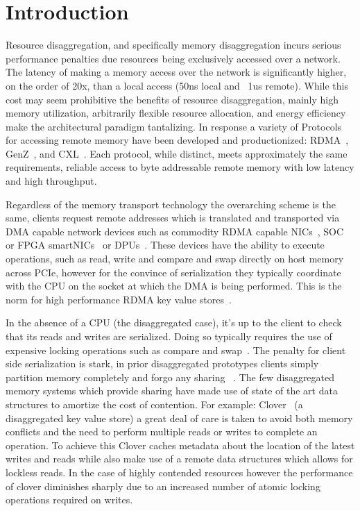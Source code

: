 \section{Introduction}

Resource disaggregation, and specifically memory disaggregation incurs serious
performance penalties due resources being exclusively accessed over a network.
The latency of making a memory access over the network is significantly higher,
on the order of 20x, than a local access (50ns local and ~1us remote).  While
this cost may seem prohibitive the benefits of resource disaggregation, mainly
high memory utilization, arbitrarily flexible resource allocation, and energy
efficiency~\cite{zombieland} make the architectural paradigm tantalizing. In
response a variety of Protocols for accessing remote memory have been developed
and productionized: RDMA~\cite{infiniband-spec}, GenZ~\cite{genz}, and
CXL~\cite{cxl}.
Each protocol, while distinct, meets approximately the same requirements,
reliable access to byte addressable remote memory with low latency and high
throughput.

Regardless of the memory transport technology the overarching scheme is the
same, clients request remote addresses which is translated and transported via  
DMA capable network devices such as commodity RDMA capable NICs~\cite{connectx},
SOC~\cite{cavium} or FPGA smartNICs~\cite{corundum,kv-direct} or
DPUs~\cite{fungible}.  These devices have the ability to execute operations,
such as read, write and compare and swap directly on host memory across PCIe,
however for the convince of serialization they typically coordinate with the CPU
on the socket at which the DMA is being performed. This is the norm for high
performance RDMA key value stores~\cite{cliquemap,erpc,herd,sonuma,storm}. 

In the absence of a CPU (the disaggregated case), it's up to the client to check
that its reads and writes are serialized. Doing so typically requires the use of
expensive locking operations such as compare and
swap~\cite{design-guidelines,clover}.  The penalty for client side serialization
is stark, in prior disaggregated prototypes clients simply partition memory
completely and forgo any sharing ~\cite{reigons,fastswap, legoos}. The few
disaggregated memory systems which provide sharing have made use of state of the
art data structures to amortize the cost of contention. For example:
Clover~\cite{clover} (a disaggregated key value store) a great deal of care is
taken to avoid both memory conflicts and the need to perform multiple reads or
writes to complete an operation. To achieve this Clover caches metadata about
the location of the latest writes and reads while also make use of a remote data
structures which allows for lockless reads. In the case of highly contended
resources however the performance of clover diminishes sharply due to an
increased number of atomic locking operations required on writes.

